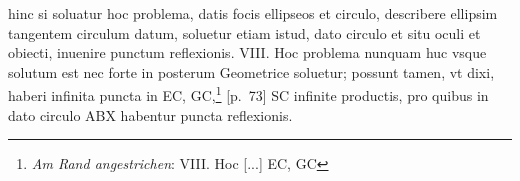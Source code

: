 \pstart [p.~72] [...] hinc si soluatur hoc problema, datis  focis ellipseos et circulo, describere ellipsim tangentem  circulum datum, soluetur etiam istud, dato circulo et  situ oculi et obiecti, inuenire punctum reflexionis\protect{}.  VIII. Hoc problema nunquam huc vsque solutum  est nec forte in posterum Geometrice soluetur; possunt  tamen, vt dixi, haberi infinita puncta in EC, GC,\footnote{\textit{Am Rand angestrichen}: VIII. Hoc [...] EC, GC} [p.~73] SC infinite productis, pro quibus in dato circulo  ABX habentur puncta reflexionis\protect{}.
